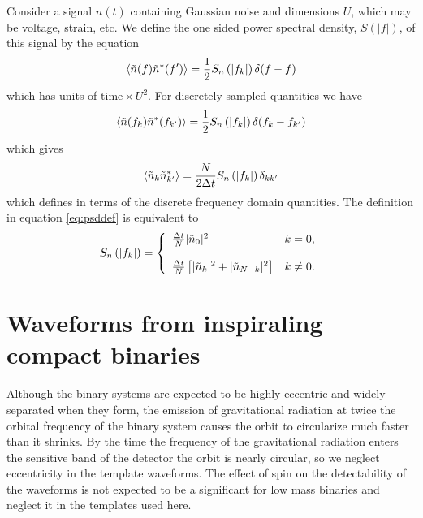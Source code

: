 Consider a signal $n(t)$ containing Gaussian noise and dimensions $U$, which
may be voltage, strain, etc. We define the one sided power spectral density,
$S(|f|)$, of this signal by the equation
\begin{equation}
\left\langle\tilde{n}(f) \tilde{n}^\ast(f')\right\rangle = 
\frac{1}{2}S_n\left(\left|f_{k}\right|\right)\delta(f-f)
\end{equation}
which has units of $\mathrm{time}\times U^2$. For discretely sampled 
quantities we have
\begin{equation}
\left\langle\tilde{n}(f_k) \tilde{n}^\ast(f_{k'})\right\rangle = 
\frac{1}{2}S_n\left(\left|f_{k}\right|\right)\delta(f_k-f_{k'})
\end{equation}
which gives
\begin{equation}
\label{eq:psddef}
\left\langle\tilde{n}_k \tilde{n}_{k'}^\ast\right\rangle = 
\frac{N}{2\Delta t}S_n\left(\left|f_{k}\right|\right)\delta_{kk'}
\end{equation}
which defines \ospsd in terms of the discrete frequency domain quantities.
The definition in equation \ref{eq:psddef} is equivalent to
\begin{equation}
S_n\left(\left|f_{k}\right|\right) = \left\{
\begin{array}{ll}
\frac{\Delta t}{N} | \tilde{n}_0 |^2 & k = 0, \\
\\
\frac{\Delta t}{N} \left[ | \tilde{n}_k |^2 + | \tilde{n}_{N-k} |^2 \right] &
k\neq 0.
\end{array}
\right.
\end{equation}

\section{Waveforms from inspiraling compact binaries}
\label{s:waveforms}

Although the binary systems are expected to be highly eccentric and widely
separated when they form\cite{bkb}, the emission of gravitational radiation at
twice the orbital frequency of the binary system causes the orbit to
circularize much faster than it shrinks\cite{peters}. By the time the
frequency of the gravitational radiation enters the sensitive band of the 
detector the orbit is nearly circular, so we neglect eccentricity in the
template waveforms. The effect of spin on the detectability of the waveforms
is not expected to be a significant for low mass binaries\cite{apos} and
neglect it in the templates used here.

